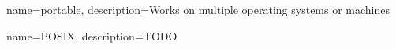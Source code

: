 {
    name=portable,
    description={Works on multiple operating systems or machines}
}

{
    name=POSIX,
    description={TODO}
}